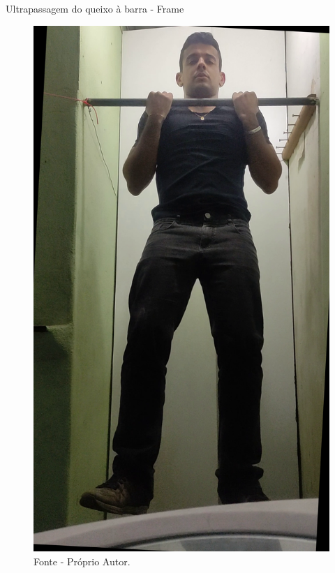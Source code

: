 \begin{frame}{Ultrapassagem do queixo à barra - Frame}
    \begin{figure}[!ht]
        \centering
            \includegraphics[scale=0.1]{img/desenvolvimento/ultrapassagemBarra/original.png}
        \caption*{Fonte - Próprio Autor.}
    \end{figure}
\end{frame}


